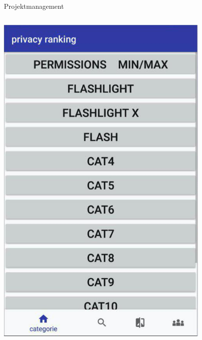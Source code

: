 \documentclass[compress,t]{beamer}
\begin{document}
\begin{frame}{Projektmanagement}
\begin{columns}[t]
        \includegraphics[width=0.8\textwidth]{img/2.jpg}
    \end{columns}

\end{frame}
\end{document}
